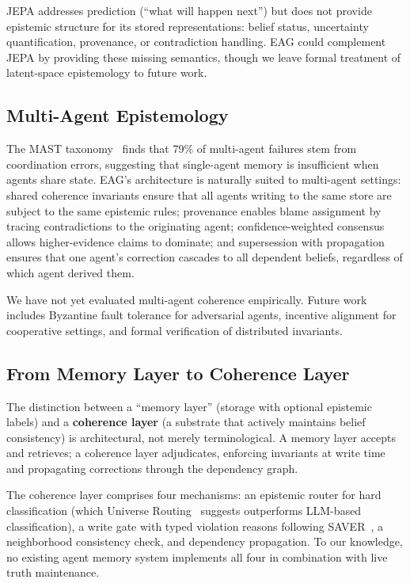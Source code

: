 \documentclass[11pt,letterpaper]{article}
\begin{document}
JEPA addresses prediction (``what will happen next'') but does not provide epistemic structure for its stored representations: belief status, uncertainty quantification, provenance, or contradiction handling. EAG could complement JEPA by providing these missing semantics, though we leave formal treatment of latent-space epistemology to future work.

\subsection{Multi-Agent Epistemology}

The MAST taxonomy~\cite{mast2025} finds that 79\% of multi-agent failures stem from coordination errors, suggesting that single-agent memory is insufficient when agents share state. EAG's architecture is naturally suited to multi-agent settings: shared coherence invariants ensure that all agents writing to the same store are subject to the same epistemic rules; provenance enables blame assignment by tracing contradictions to the originating agent; confidence-weighted consensus allows higher-evidence claims to dominate; and supersession with propagation ensures that one agent's correction cascades to all dependent beliefs, regardless of which agent derived them.

We have not yet evaluated multi-agent coherence empirically. Future work includes Byzantine fault tolerance for adversarial agents, incentive alignment for cooperative settings, and formal verification of distributed invariants.

\subsection{From Memory Layer to Coherence Layer}

The distinction between a ``memory layer'' (storage with optional epistemic labels) and a \textbf{coherence layer} (a substrate that actively maintains belief consistency) is architectural, not merely terminological. A memory layer accepts and retrieves; a coherence layer adjudicates, enforcing invariants at write time and propagating corrections through the dependency graph.

The coherence layer comprises four mechanisms: an epistemic router for hard classification (which Universe Routing~\cite{universe2026} suggests outperforms LLM-based classification), a write gate with typed violation reasons following SAVER~\cite{yuan2026saver}, a neighborhood consistency check, and dependency propagation. To our knowledge, no existing agent memory system implements all four in combination with live truth maintenance.
\end{document}
